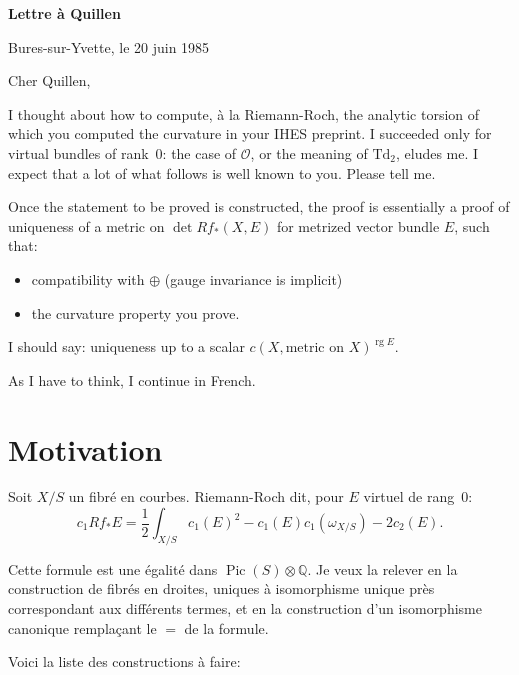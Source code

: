\documentclass[11pt,a4paper]{article}
\theoremstyle{plain}
\theoremstyle{definition}
\DeclareMathOperator{\Pic}{Pic}
\DeclareMathOperator{\rg}{rg}
\newcommand{\Q}{\mathbb{Q}}
\newcommand{\cO}{\mathcal{O}}
\begin{document}
\begin{center}
\textbf{\Large Lettre \`a Quillen}
\end{center}

\vspace{1cm}

\noindent\hfill Bures-sur-Yvette, le 20 juin 1985

\vspace{0.5cm}

\noindent Cher Quillen,

\medskip

I thought about how to compute, \`a la Riemann-Roch, the analytic torsion of which you computed the curvature in your IHES preprint. I succeeded only for virtual bundles of rank~0: the case of $\cO$, or the meaning of $\mathrm{Td}_2$, eludes me. I expect that a lot of what follows is well known to you. Please tell me.

Once the statement to be proved is constructed, the proof is essentially a proof of uniqueness of a metric on $\det Rf_*(X,E)$ for metrized vector bundle $E$, such that:
\begin{itemize}
\item compatibility with $\oplus$ (gauge invariance is implicit)
\item the curvature property you prove.
\end{itemize}
I should say: uniqueness up to a scalar $c(X, \text{metric on } X)^{\rg E}$.

As I have to think, I continue in French.

\tableofcontents

\newpage

\section{Motivation}

Soit $X/S$ un fibr\'e en courbes. Riemann-Roch dit, pour $E$ virtuel de rang~0:
\begin{equation}
c_1 Rf_* E = \frac{1}{2} \int_{X/S} c_1(E)^2 - c_1(E) c_1(\omega_{X/S}) - 2c_2(E).
\end{equation}

Cette formule est une \'egalit\'e dans $\Pic(S) \otimes \Q$. Je veux la relever en la construction de fibr\'es en droites, uniques \`a isomorphisme unique pr\`es correspondant aux diff\'erents termes, et en la construction d'un isomorphisme canonique rempla\c{c}ant le $=$ de la formule.

Voici la liste des constructions \`a faire:
\end{document}
